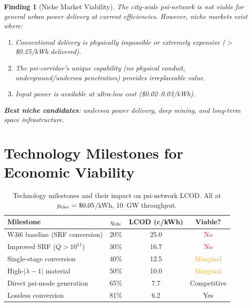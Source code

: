 \documentclass[11pt]{article}
\newtheorem{finding}{Finding}
\newcommand{\lambdaone}{|\lambda{-}1|}
\begin{document}
\begin{finding}[Niche Market Viability]
\label{find:niche}
The city-scale psi-network is not viable for general urban power
delivery at current efficiencies. However, niche markets exist where:
\begin{enumerate}[nosep]
  \item Conventional delivery is physically impossible or extremely
    expensive ($>$\$0.25/kWh delivered).
  \item The psi-corridor's unique capability (no physical conduit,
    underground/undersea penetration) provides irreplaceable value.
  \item Input power is available at ultra-low cost (\$0.02--0.03/kWh).
\end{enumerate}

\textbf{Best niche candidates}: undersea power delivery, deep mining,
and long-term space infrastructure.
\end{finding}

\section{Technology Milestones for Economic Viability}
\label{sec:P12-milestones}

\begin{table}[h]
\centering
\caption{Technology milestones and their impact on psi-network LCOD.
All at $p_{\rm elec} = \$0.05$/kWh, 10~GW throughput.}
\label{tab:milestones}
\begin{tabular}{@{}p{5cm}ccc@{}}
\toprule
Milestone & $\eta_{\rm e2e}$ & LCOD (c/kWh) & Viable? \\
\midrule
W3i6 baseline (SRF conversion) & 20\% & 25.0 & \textcolor{red}{No} \\
Improved SRF ($Q > 10^{11}$) & 30\% & 16.7 & \textcolor{red}{No} \\
Single-stage conversion & 40\% & 12.5 & \textcolor{orange}{Marginal} \\
High-$\lambdaone$ material & 50\% & 10.0 & \textcolor{orange}{Marginal} \\
Direct psi-mode generation & 65\% & 7.7 & \textcolor{green!50!black}{Competitive} \\
Lossless conversion & 81\% & 6.2 & \textcolor{green!50!black}{Yes} \\
\bottomrule
\end{tabular}
\end{table}
\end{document}
